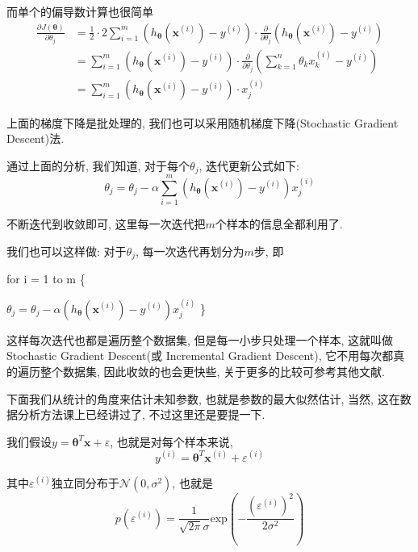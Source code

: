 \documentclass[a4paper,UTF8]{ctexart}
\theoremstyle{plain} \newtheorem{theorem}{定理}[section]
\theoremstyle{plain} \newtheorem{definition}{定义}[section]
\theoremstyle{plain} \newtheorem{lemma}{引理}[section]
\theoremstyle{plain} \newtheorem{proposition}{命题}[section]
\theoremstyle{plain} \newtheorem{example}{例}[section]
\theoremstyle{plain} \newtheorem{remark}{注}[section]
\theoremstyle{plain} \newtheorem{corollary}{推论}[section]
\newcommand{\p}[3]{\frac{\partial^{#1}#2}{\partial{#3}^{#1}}}  %
\begin{document}
而单个的偏导数计算也很简单
\begin{align*}
\p{}{J(\bm{\theta})}{\theta_j} & = \frac{1}{2} \cdot 2 \sum_{i=1}^{m} (h_{\bm{\theta}}(\bm{x}^{(i)}) - y^{(i)}) \cdot \frac{\partial}{\partial \theta_j} (h_{\bm{\theta}}(\bm{x}^{(i)}) - y^{(i)}) \\ 
& = \sum_{i=1}^{m} (h_{\bm{\theta}}(\bm{x}^{(i)}) - y^{(i)}) \cdot \frac{\partial}{\partial \theta_j} \left( \sum_{k=1}^{n} \theta_k x^{(i)}_k  - y^{(i)}\right) \\ 
& = \sum_{i=1}^{m} (h_{\bm{\theta}}(\bm{x}^{(i)}) - y^{(i)}) \cdot x_{j}^{(i)}
\end{align*}

上面的梯度下降是批处理的, 我们也可以采用随机梯度下降(Stochastic Gradient Descent)法.

通过上面的分析, 我们知道, 对于每个$\theta_j$, 迭代更新公式如下:
\begin{equation*}
\theta_{j} = \theta_{j} - \alpha \sum_{i=1}^{m} (h_{\bm{\theta}}(\bm{x}^{(i)}) - y^{(i)}) x_{j}^{(i)}
\end{equation*}

不断迭代到收敛即可, 这里每一次迭代把$m$个样本的信息全都利用了.

我们也可以这样做: 对于$\theta_{j}$, 每一次迭代再划分为$m$步, 即

for i = 1 to m \{

\quad $\theta_{j} = \theta_{j} - \alpha  \left(h_{\bm{\theta}}(\bm{x}^{(i)}) - y^{(i)} \right) x_{j}^{(i)}$ \}

这样每次迭代也都是遍历整个数据集, 但是每一小步只处理一个样本, 这就叫做 Stochastic Gradient Descent(或 Incremental Gradient Descent), 它不用每次都真的遍历整个数据集, 因此收敛的也会更快些, 关于更多的比较可参考其他文献.

下面我们从统计的角度来估计未知参数, 也就是参数的最大似然估计, 当然, 这在数据分析方法课上已经讲过了, 不过这里还是要提一下.

我们假设$y = \bm{\theta}^{T} \bm{x} + \varepsilon$, 也就是对每个样本来说, 
\begin{equation*}
y^{(i)} = \bm{\theta}^{T} \bm{x}^{(i)} + \varepsilon^{(i)}
\end{equation*}

其中$\varepsilon^{(i)}$独立同分布于$\mathcal{N}(0, \sigma^2)$, 也就是
\begin{equation*}
p(\varepsilon^{(i)}) = \frac{1}{\sqrt{2 \pi} \sigma} \mathrm{exp} \left(- \frac{(\varepsilon^{(i)})^2}{2 \sigma^2} \right)
\end{equation*}
\end{document}
